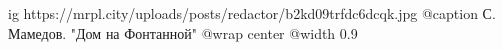  
 
 
 
 

\ifcmt
  ig https://mrpl.city/uploads/posts/redactor/b2kd09trfdc6dcqk.jpg
	@caption С. Мамедов. "Дом на Фонтанной"
  @wrap center
  @width 0.9
\fi
